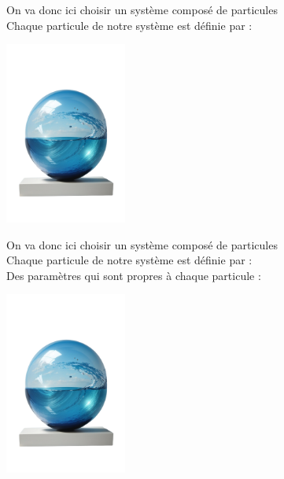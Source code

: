 \documentclass{article}
\begin{document}
\newpage
\vspace*{2pt}
\thispagestyle{landscape}
\parbox{0.7\textwidth}{
On va donc ici choisir un système composé de particules
\\Chaque particule  de notre système est définie par : 
}
\parbox{0.3\textwidth}{
    \includegraphics[width=0.3\textwidth]{particule}
}
\vspace*{\fill}

\newpage
\vspace*{2pt}
\thispagestyle{landscape}
\parbox{0.7\textwidth}{
On va donc ici choisir un système composé de particules
\\Chaque particule  de notre système est définie par : 
\\Des paramètres qui sont propres à chaque particule :
}
\parbox{0.3\textwidth}{
    \includegraphics[width=0.3\textwidth]{particule}
}
\vspace*{\fill}
\end{document}
